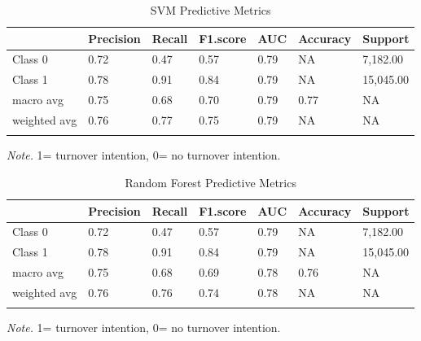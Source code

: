 \documentclass[
  man]{apa7}
\begin{document}
\begin{table}[tbp]

\begin{center}
\begin{threeparttable}

\caption{\label{tab:svm40}SVM Predictive Metrics}

\begin{tabular}{lllllll}
\toprule
 & \multicolumn{1}{c}{Precision} & \multicolumn{1}{c}{Recall} & \multicolumn{1}{c}{F1.score} & \multicolumn{1}{c}{AUC} & \multicolumn{1}{c}{Accuracy} & \multicolumn{1}{c}{Support}\\
\midrule
Class 0 & 0.72 & 0.47 & 0.57 & 0.79 & NA & 7,182.00\\
Class 1 & 0.78 & 0.91 & 0.84 & 0.79 & NA & 15,045.00\\
macro avg & 0.75 & 0.68 & 0.70 & 0.79 & 0.77 & NA\\
weighted avg & 0.76 & 0.77 & 0.75 & 0.79 & NA & NA\\
\bottomrule
\addlinespace
\end{tabular}

\begin{tablenotes}[para]
\normalsize{\textit{Note.} 1= turnover intention, 0= no turnover intention.}
\end{tablenotes}

\end{threeparttable}
\end{center}

\end{table}

\begin{table}[tbp]

\begin{center}
\begin{threeparttable}

\caption{\label{tab:rf40}Random Forest Predictive Metrics}

\begin{tabular}{lllllll}
\toprule
 & \multicolumn{1}{c}{Precision} & \multicolumn{1}{c}{Recall} & \multicolumn{1}{c}{F1.score} & \multicolumn{1}{c}{AUC} & \multicolumn{1}{c}{Accuracy} & \multicolumn{1}{c}{Support}\\
\midrule
Class 0 & 0.72 & 0.47 & 0.57 & 0.79 & NA & 7,182.00\\
Class 1 & 0.78 & 0.91 & 0.84 & 0.79 & NA & 15,045.00\\
macro avg & 0.75 & 0.68 & 0.69 & 0.78 & 0.76 & NA\\
weighted avg & 0.76 & 0.76 & 0.74 & 0.78 & NA & NA\\
\bottomrule
\addlinespace
\end{tabular}

\begin{tablenotes}[para]
\normalsize{\textit{Note.} 1= turnover intention, 0= no turnover intention.}
\end{tablenotes}

\end{threeparttable}
\end{center}

\end{table}
\end{document}
